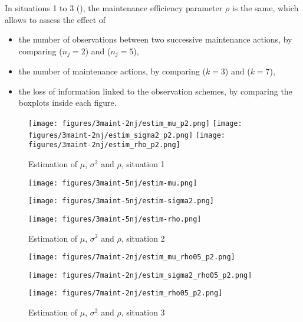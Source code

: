 In situations 1 to 3 (), the maintenance efficiency parameter $\rho$ is the same, which allows to assess the effect of 
\begin{itemize}
\item the number of observations between two successive maintenance actions, by comparing   ($n_j=2$) and  ($n_j=5$),
\item the number of maintenance actions, by comparing  ($k=3$) and  ($k=7$),
\item the loss of information linked to the observation schemes, by comparing the boxplots inside each figure.

\end{itemize}


\begin{figure}[h!]
\begin{multicols}{3}

\texttt{[image: figures/3maint-2nj/estim\_mu\_p2.png]}
\columnbreak
\texttt{[image: figures/3maint-2nj/estim\_sigma2\_p2.png]}  
\columnbreak
\texttt{[image: figures/3maint-2nj/estim\_rho\_p2.png]}  
\end{multicols} 
\vspace{-6mm}
\caption{Estimation of $\mu$, $\sigma^2$ and $\rho$, situation 1}

\label{estim1}
\end{figure}

\begin{figure}[h!]
\begin{multicols}{3}


\texttt{[image: figures/3maint-5nj/estim-mu.png]}\\
\columnbreak

\texttt{[image: figures/3maint-5nj/estim-sigma2.png]}  \\
\columnbreak

\texttt{[image: figures/3maint-5nj/estim-rho.png]}  
\end{multicols}
\vspace{-6mm}
\caption{Estimation of $\mu$, $\sigma^2$ and $\rho$, situation 2}
\label{estim2}
\end{figure} 


\begin{figure}[h!]
\begin{multicols}{3}
\texttt{[image: figures/7maint-2nj/estim\_mu\_rho05\_p2.png]}\\

\columnbreak

\texttt{[image: figures/7maint-2nj/estim\_sigma2\_rho05\_p2.png]} \\

\columnbreak

\texttt{[image: figures/7maint-2nj/estim\_rho05\_p2.png]}
\end{multicols}
\vspace{-6mm}
\caption{Estimation of $\mu$, $\sigma^2$ and $\rho$, situation 3}
\label{estim5}
\end{figure}

